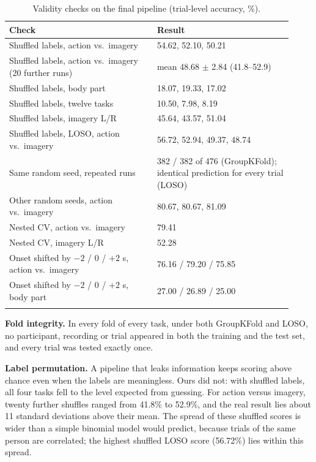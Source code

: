 \documentclass[pdflatex,sn-mathphys-num]{sn-jnl}%
\theoremstyle{thmstyleone}%
\theoremstyle{thmstyletwo}%
\theoremstyle{thmstylethree}%
\begin{document}
\begin{table}[htbp]
\centering
\caption{Validity checks on the final pipeline (trial-level accuracy, \%).}
\label{tab:validity}
\footnotesize
\begin{tabular}{@{}p{0.48\linewidth}p{0.44\linewidth}@{}}
\toprule
\textbf{Check} & \textbf{Result} \\
\midrule
Shuffled labels, action vs.\ imagery & 54.62, 52.10, 50.21 \\
Shuffled labels, action vs.\ imagery (20 further runs) & mean 48.68 $\pm$ 2.84 (41.8--52.9) \\
Shuffled labels, body part & 18.07, 19.33, 17.02 \\
Shuffled labels, twelve tasks & 10.50, 7.98, 8.19 \\
Shuffled labels, imagery L/R & 45.64, 43.57, 51.04 \\
Shuffled labels, LOSO, action vs.\ imagery & 56.72, 52.94, 49.37, 48.74 \\
\addlinespace
Same random seed, repeated runs & 382 / 382 of 476 (GroupKFold); identical prediction for every trial (LOSO) \\
Other random seeds, action vs.\ imagery & 80.67, 80.67, 81.09 \\
\addlinespace
Nested CV, action vs.\ imagery & 79.41 \\
Nested CV, imagery L/R & 52.28 \\
\addlinespace
Onset shifted by $-2$ / 0 / $+2$ s, action vs.\ imagery & 76.16 / 79.20 / 75.85 \\
Onset shifted by $-2$ / 0 / $+2$ s, body part & 27.00 / 26.89 / 25.00 \\
\botrule
\end{tabular}
\end{table}

\textbf{Fold integrity.} In every fold of every task, under both GroupKFold and LOSO, no participant, recording or trial appeared in both the training and the test set, and every trial was tested exactly once.

\textbf{Label permutation.} A pipeline that leaks information keeps scoring above chance even when the labels are meaningless. Ours did not: with shuffled labels, all four tasks fell to the level expected from guessing. For action versus imagery, twenty further shuffles ranged from 41.8\% to 52.9\%, and the real result lies about 11 standard deviations above their mean. The spread of these shuffled scores is wider than a simple binomial model would predict, because trials of the same person are correlated; the highest shuffled LOSO score (56.72\%) lies within this spread.
\end{document}
